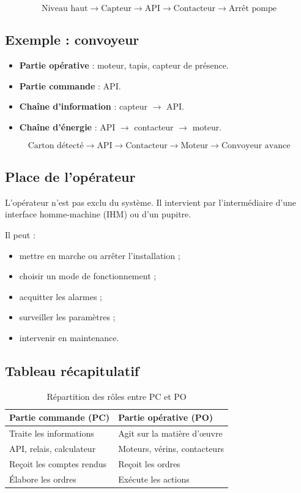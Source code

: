 \[
\text{Niveau haut} \rightarrow \text{Capteur} \rightarrow \text{API} \rightarrow \text{Contacteur} \rightarrow \text{Arrêt pompe}
\]

\subsection{Exemple : convoyeur}

\begin{itemize}
    \item \textbf{Partie opérative} : moteur, tapis, capteur de présence.
    \item \textbf{Partie commande} : API.
    \item \textbf{Chaîne d'information} : capteur $\rightarrow$ API.
    \item \textbf{Chaîne d'énergie} : API $\rightarrow$ contacteur $\rightarrow$ moteur.
\end{itemize}

\[
\text{Carton détecté} \rightarrow \text{API} \rightarrow \text{Contacteur} \rightarrow \text{Moteur} \rightarrow \text{Convoyeur avance}
\]

\subsection{Place de l'opérateur}

L'opérateur n'est pas exclu du système. Il intervient par l'intermédiaire d'une interface homme-machine (IHM) ou d'un pupitre.

Il peut :

\begin{itemize}
    \item mettre en marche ou arrêter l'installation ;
    \item choisir un mode de fonctionnement ;
    \item acquitter les alarmes ;
    \item surveiller les paramètres ;
    \item intervenir en maintenance.
\end{itemize}

\subsection{Tableau récapitulatif}

\begin{table}[h]
\centering
\begin{tabularx}{\textwidth}{|X|X|}
\hline
\textbf{Partie commande (PC)} & \textbf{Partie opérative (PO)} \\
\hline
Traite les informations & Agit sur la matière d'œuvre \\
\hline
API, relais, calculateur & Moteurs, vérins, contacteurs \\
\hline
Reçoit les comptes rendus & Reçoit les ordres \\
\hline
Élabore les ordres & Exécute les actions \\
\hline
\end{tabularx}
\caption{Répartition des rôles entre PC et PO}
\end{table}

